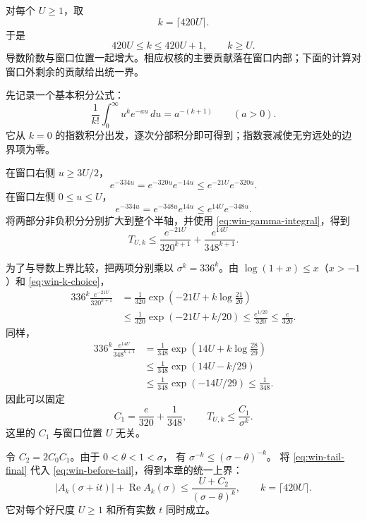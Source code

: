对每个 $U\ge1$，取
\begin{equation}
 k=\lceil420U\rceil.
 \label{eq:win-k-choice}
\end{equation}
于是
\[
 420U\le k\le420U+1,\qquad k\ge U.
\]
导数阶数与窗口位置一起增大。相应权核的主要贡献落在窗口内部；下面的计算对窗口外剩余的贡献给出统一界。

先记录一个基本积分公式：
\begin{equation}
 \frac1{k!}\int_0^\infty u^ke^{-au}\,du
       =a^{-(k+1)}\qquad(a>0).
 \label{eq:win-gamma-integral}
\end{equation}
它从 $k=0$ 的指数积分出发，逐次分部积分即可得到；指数衰减使无穷远处的边界项为零。

在窗口右侧 $u\ge3U/2$，
\[
 e^{-334u}=e^{-320u}e^{-14u}
       \le e^{-21U}e^{-320u}.
\]
在窗口左侧 $0\le u\le U$，
\[
 e^{-334u}=e^{-348u}e^{14u}
       \le e^{14U}e^{-348u}.
\]
将两部分非负积分分别扩大到整个半轴，并使用
\eqref{eq:win-gamma-integral}，得到
\begin{equation}
 T_{U,k}\le
 \frac{e^{-21U}}{320^{k+1}}
 +\frac{e^{14U}}{348^{k+1}}.
 \label{eq:win-tail-two}
\end{equation}

为了与导数上界比较，把两项分别乘以 $\sigma^k=336^k$。由
$\log(1+x)\le x$（$x>-1$）和 \eqref{eq:win-k-choice}，
\begin{align*}
 336^k\frac{e^{-21U}}{320^{k+1}}
 &=\frac1{320}
   \exp\left(-21U+k\log\frac{21}{20}\right)\\
 &\le\frac1{320}\exp(-21U+k/20)
 \le\frac{e^{1/20}}{320}
 \le\frac e{320}.
\end{align*}
同样，
\begin{align*}
 336^k\frac{e^{14U}}{348^{k+1}}
 &=\frac1{348}
   \exp\left(14U+k\log\frac{28}{29}\right)\\
 &\le\frac1{348}\exp(14U-k/29)\\
 &\le\frac1{348}\exp(-14U/29)
 \le\frac1{348}.
\end{align*}
因此可以固定
\begin{equation}
 C_1=\frac e{320}+\frac1{348},
 \qquad
 T_{U,k}\le\frac{C_1}{\sigma^k}.
 \label{eq:win-tail-final}
\end{equation}
这里的 $C_1$ 与窗口位置 $U$ 无关。

令 $C_2=2C_0C_1$。由于 $0<\theta<1<\sigma$，
有 $\sigma^{-k}\le(\sigma-\theta)^{-k}$。
将 \eqref{eq:win-tail-final} 代入
\eqref{eq:win-before-tail}，得到本章的统一上界：
\begin{equation}
 \boxed{\;
 |A_k(\sigma+it)|+\operatorname{Re}A_k(\sigma)
 \le\frac{U+C_2}{(\sigma-\theta)^k},
 \qquad k=\lceil420U\rceil.
 \;}
 \label{eq:win-master-upper}
\end{equation}
它对每个好尺度 $U\ge1$ 和所有实数 $t$ 同时成立。

